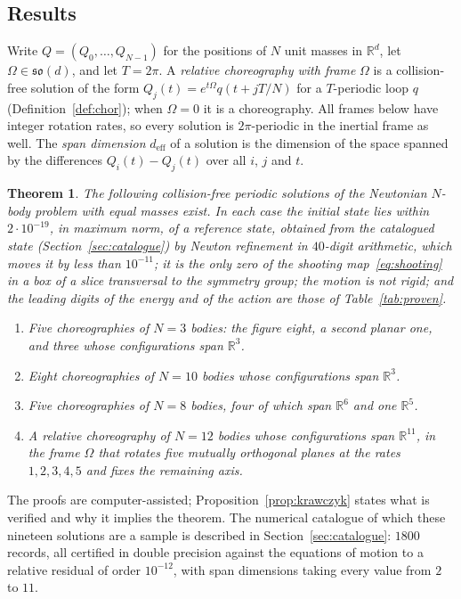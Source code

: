 \documentclass[11pt]{amsart}
\newtheorem{theorem}{Theorem}[section]
\theoremstyle{definition}
\newcommand{\R}{\mathbb{R}}
\newcommand{\so}{\mathfrak{so}}
\newcommand{\deff}{d_{\mathrm{eff}}}
\begin{document}
\subsection*{Results}
Write $Q=(Q_0,\dots,Q_{N-1})$ for the positions of $N$ unit masses in $\R^d$, let $\Omega\in\so(d)$, and let $T=2\pi$. A \emph{relative choreography with frame} $\Omega$ is a collision-free solution of the form $Q_j(t)=e^{t\Omega}q(t+jT/N)$ for a $T$-periodic loop $q$ (Definition~\ref{def:chor}); when $\Omega=0$ it is a choreography. All frames below have integer rotation rates, so every solution is $2\pi$-periodic in the inertial frame as well. The \emph{span dimension} $\deff$ of a solution is the dimension of the space spanned by the differences $Q_i(t)-Q_j(t)$ over all $i$, $j$ and $t$.

\begin{theorem}\label{thm:main}
The following collision-free periodic solutions of the Newtonian $N$-body problem with equal masses exist. In each case the initial state lies within $2\cdot10^{-19}$, in maximum norm, of a reference state, obtained from the catalogued state (Section~\ref{sec:catalogue}) by Newton refinement in $40$-digit arithmetic, which moves it by less than $10^{-11}$; it is the only zero of the shooting map~\eqref{eq:shooting} in a box of a slice transversal to the symmetry group; the motion is not rigid; and the leading digits of the energy and of the action are those of Table~\ref{tab:proven}.
\begin{enumerate}
\item Five choreographies of $N=3$ bodies: the figure eight, a second planar one, and three whose configurations span $\R^3$.
\item Eight choreographies of $N=10$ bodies whose configurations span $\R^3$.
\item Five choreographies of $N=8$ bodies, four of which span $\R^6$ and one $\R^5$.
\item A relative choreography of $N=12$ bodies whose configurations span $\R^{11}$, in the frame $\Omega$ that rotates five mutually orthogonal planes at the rates $1,2,3,4,5$ and fixes the remaining axis.
\end{enumerate}
\end{theorem}

The proofs are computer-assisted; Proposition~\ref{prop:krawczyk} states what is verified and why it implies the theorem. The numerical catalogue of which these nineteen solutions are a sample is described in Section~\ref{sec:catalogue}: $1800$ records, all certified in double precision against the equations of motion to a relative residual of order $10^{-12}$, with span dimensions taking every value from $2$ to $11$.
\end{document}
